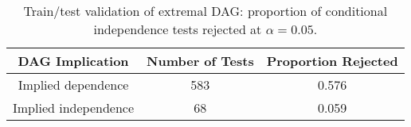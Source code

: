 \begin{table}[!h]
\centering
\caption{Train/test validation of extremal DAG: proportion of conditional independence tests rejected at $\alpha=0.05$.}
\centering
\begin{tabular}[t]{ccc}
\toprule
DAG Implication & Number of Tests & Proportion Rejected\\
\midrule
Implied dependence & 583 & 0.576\\
Implied independence & 68 & 0.059\\
\bottomrule
\end{tabular}
\end{table}
